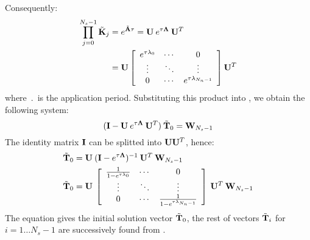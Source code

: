 Consequently:
\begin{align*}
  \prod_{j = 0}^{N_s - 1} \tilde{\mathbf{K}}_j & = e^{\tilde{\mathbf{A}} \tau} = \mathbf{U} \: e^{\tau \mathbf{\Lambda}} \: \mathbf{U}^T \\
    & = \mathbf{U} \left[
      \begin{array}{ccc}
        e^{\tau \lambda_0} & \cdots & 0 \\
        \vdots & \ddots & \vdots \\
        0 & \cdots & e^{\tau \lambda_{N_n - 1}}
      \end{array}
    \right] \mathbf{U}^T
\end{align*}
where $\period$ is the application period. Substituting this product into , we obtain the following system:
\[
  (\mathbf{I} - \mathbf{U} \: e^{\tau \mathbf{\Lambda}} \: \mathbf{U}^T) \: \tilde{\mathbf{T}}_0 = \mathbf{W}_{N_s - 1}
\]
The identity matrix $\mathbf{I}$ can be splitted into $\mathbf{U} \mathbf{U}^T$, hence:
\begin{align*}
  & \tilde{\mathbf{T}}_0 = \mathbf{U} \: (\mathbf{I} - e^{\tau \mathbf{\Lambda}})^{-1} \: \mathbf{U}^T \: \mathbf{W}_{N_s - 1} \\
  & \tilde{\mathbf{T}}_0 = \mathbf{U} \: \left[
      \begin{array}{ccc}
        \frac{1}{1 - e^{\tau \lambda_0}} & \cdots & 0 \\
        \vdots & \ddots & \vdots \\
        0 & \cdots & \frac{1}{1 - e^{\tau \lambda_{N_n - 1}}}
      \end{array}
    \right] \: \mathbf{U}^T \: \mathbf{W}_{N_s - 1}
\end{align*}
The equation gives the initial solution vector $\tilde{\mathbf{T}}_0$, the rest of vectors $\tilde{\mathbf{T}}_i$ for \mbox{$i = 1 \dots N_s - 1$} are successively found from .

